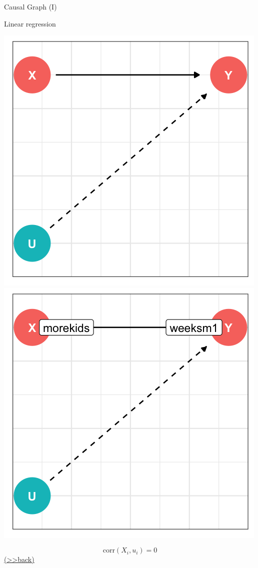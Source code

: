 \documentclass[
  10pt,
  ignorenonframetext,
]{beamer}
\begin{document}
\begin{frame}{Causal Graph (I)}
\protect\hypertarget{LGCG}{}
\begin{block}{Linear regression}
\protect\hypertarget{linear-regression-1}{}
\begin{center}\includegraphics[width=0.4\linewidth,height=0.54\textheight]{pictures/LGsetting1} \includegraphics[width=0.4\linewidth,height=0.54\textheight]{pictures/LGsetting2} \end{center}

\[
\text{corr}(X_i,u_i)  = 0
\] \footnotesize\protect\hyperlink{LGQ}{(\textgreater\textgreater back)}
\normalsize
\end{block}
\end{frame}
\end{document}

